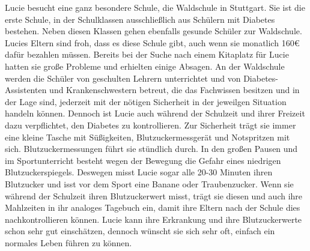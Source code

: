 {		Lucie besucht eine ganz besondere Schule, die Waldschule in \newline
		Stuttgart. Sie ist die erste Schule, in der Schulklassen ausschließlich \newline
		aus Schülern mit Diabetes bestehen. Neben diesen Klassen gehen \newline
		ebenfalls gesunde Schüler zur Waldschule. Lucies Eltern sind froh, \newline
		dass es diese Schule gibt, auch wenn sie monatlich 160\euro{} dafür bezahlen \newline
		müssen. Bereits bei der Suche nach einem Kitaplatz für Lucie hatten \newline
		sie große Probleme und erhielten einige Absagen. An der Waldschule \newline
		werden die Schüler von geschulten Lehrern unterrichtet und von Diabetes-\newline
		Assistenten und Krankenschwestern betreut, die das Fachwissen besitzen \newline
		und in der Lage sind, jederzeit mit der nötigen Sicherheit in der \newline
		jeweilgen Situation handeln können.\newline
		Dennoch ist Lucie auch während der Schulzeit und ihrer Freizeit dazu \newline
		verpflichtet, den Diabetes zu kontrollieren. Zur Sicherheit trägt sie \newline
		immer eine kleine Tasche mit Süßigkeiten, Blutzuckermessgerät und \newline
		Notspritzen mit sich. Blutzuckermessungen führt sie stündlich durch.\newline
		In den großen Pausen und im Sportunterricht besteht wegen der \newline
		Bewegung die Gefahr eines niedrigen Blutzuckerspiegels. Deswegen \newline
		misst Lucie sogar alle 20-30 Minuten ihren Blutzucker und isst vor dem \newline
		Sport eine Banane oder Traubenzucker. Wenn sie während der \newline
		Schulzeit ihren Blutzuckerwert misst, trägt sie diesen und auch ihre\newline
		Mahlzeiten in ihr analoges Tagebuch ein, damit ihre Eltern nach der \newline
		Schule dies nachkontrollieren können.\newline
		Lucie kann ihre Erkrankung und ihre Blutzuckerwerte schon sehr gut \newline
		einschätzen, dennoch wünscht sie sich sehr oft, einfach ein normales\newline
		Leben führen zu können.}\\

